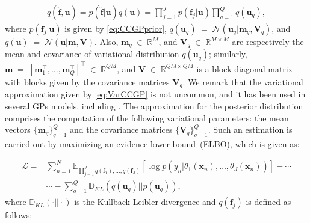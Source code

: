 \documentclass[journal]{IEEEtran}
\providecommand{\ve}[1]{{\bm{#1}}}%
\providecommand{\mat}[1]{{\bm{#1}}} %
\newcommand{\Real}{\mathbb{R}}
\DeclareMathOperator{\en}{\!\,\in\!\,}
\DeclareMathOperator{\igual}{\!\,=\!\,}
\providecommand{\ve}[1]{{\mathbf{#1}}}
\providecommand{\mat}[1]{{\mathbf{#1}}}
\newcommand{\gauss}{\mathcal{N}} %
\begin{document}
\begin{align}
\label{eq:VarCCGP}
q(\hat{\ve{f}}, {\ve{u}}) = p(\hat{\ve{f}}|{\ve{u}})q({\ve{u}})= \prod_{j=1}^{J}p(\ve{f}_j|{\ve{u}})\prod_{q=1}^{Q}q(\ve{u}_q),
\end{align}
where $p(\ve{f}_j|{\ve{u}})$ is given by \cref{eq:CCGPprior}, $q(\ve{u}_q)\igual\gauss(\ve{u}_q|\ve{m}_q,\mat{V}_q)$, and $q({\ve{u}})\igual \gauss({\ve{u}}|\ve{m},\mat{V})$. Also, $\ve{m}_q\en\Real^{M}$, and $\mat{V}_q\en \Real^{M\times M}$ are respectively the mean and covariance of variational distribution $q(\ve{u}_q)$; similarly, $\ve{m} \igual [\ve{m}_1^{\top}, \dots , \ve{m}_Q^{\top}]^{\top}\en \Real^{QM}$, and $\mat{V}\en \Real^{QM\times QM}$ is a block-diagonal matrix with blocks given by the covariance matrices $\mat{V}_q$. We remark that the variational approximation given by \cref{eq:VarCCGP} is not uncommon, and it has been used in several GPs models, including \cite{saul2016chained,moreno2018heterogeneous}.
The approximation for the posterior distribution comprises the computation of the following variational parameters: the mean vectors $\{\ve{m}_q\}_{q=1}^{Q}$ and the covariance matrices $\{\mat{V}_q\}_{q=1}^{Q}$. Such an estimation is carried out by maximizing an evidence lower bound--(ELBO), which is given as:

\begin{align}
\mathcal{L}
=&\sum_{n=1}^{N}\mathbb{E}_{\prod\limits^J_{j=1}q(\ve{f}_1),\dots , q(\ve{f}_J)}\left[\log p(y_n|\theta_1(\ve{x}_n),\dots , \theta_J(\ve{x}_n))\right]-\cdots\nonumber\\
&\cdots-\sum_{q=1}^{Q} \mathbb{D}_{KL}(q(\ve{u}_q)||p(\ve{u}_q))\label{eq:LowBound21},
\end{align}
where $\mathbb{D}_{KL}(\cdot||\cdot)$ is the Kullback-Leibler divergence and $q(\ve{f}_j)$ is defined as follows:
\end{document}
